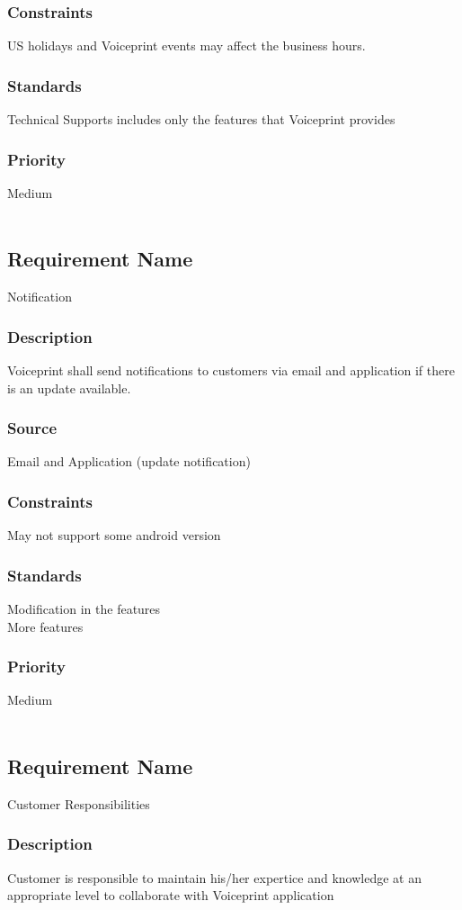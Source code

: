 \subsubsection{Constraints}
US holidays and Voiceprint events may affect the business hours.
\subsubsection{Standards}
Technical Supports includes only the features that Voiceprint provides
\subsubsection{Priority}
Medium
\\
\\
\subsection{Requirement Name}
Notification
\subsubsection{Description}
Voiceprint shall send notifications to customers via email and application if there is an update available.
\subsubsection{Source}
Email and Application (update notification)
\subsubsection{Constraints}
May not support some android version
\subsubsection{Standards}
Modification in the features \\
More features 
\subsubsection{Priority}
Medium
\\
\\
\subsection{Requirement Name}
Customer Responsibilities
\subsubsection{Description}
Customer is responsible to maintain his/her expertice and knowledge at an appropriate level to collaborate with Voiceprint application
